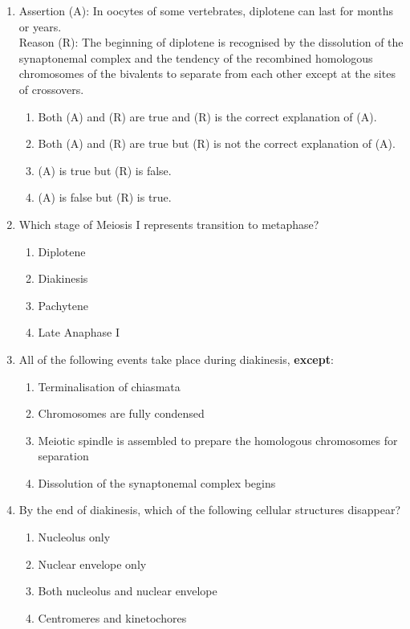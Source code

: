 \documentclass[11pt,a4paper]{article}
\begin{document}
\begin{enumerate}[label=\textbf{\arabic*.}]
\item Assertion (A): In oocytes of some vertebrates, diplotene can last for months or years.\\
Reason (R): The beginning of diplotene is recognised by the dissolution of the synaptonemal complex and the tendency of the recombined homologous chromosomes of the bivalents to separate from each other except at the sites of crossovers.
\begin{enumerate}[label=(\Alph*)]
    \item Both (A) and (R) are true and (R) is the correct explanation of (A).
    \item Both (A) and (R) are true but (R) is not the correct explanation of (A).
    \item (A) is true but (R) is false.
    \item (A) is false but (R) is true.
\end{enumerate}

\item Which stage of Meiosis I represents transition to metaphase?
\begin{enumerate}[label=(\Alph*)]
    \item Diplotene
    \item Diakinesis
    \item Pachytene
    \item Late Anaphase I
\end{enumerate}

\item All of the following events take place during diakinesis, \textbf{except}:
\begin{enumerate}[label=(\Alph*)]
    \item Terminalisation of chiasmata
    \item Chromosomes are fully condensed
    \item Meiotic spindle is assembled to prepare the homologous chromosomes for separation
    \item Dissolution of the synaptonemal complex begins
\end{enumerate}

\item By the end of diakinesis, which of the following cellular structures disappear?
\begin{enumerate}[label=(\Alph*)]
    \item Nucleolus only
    \item Nuclear envelope only
    \item Both nucleolus and nuclear envelope
    \item Centromeres and kinetochores
\end{enumerate}


\end{enumerate}
\end{document}
